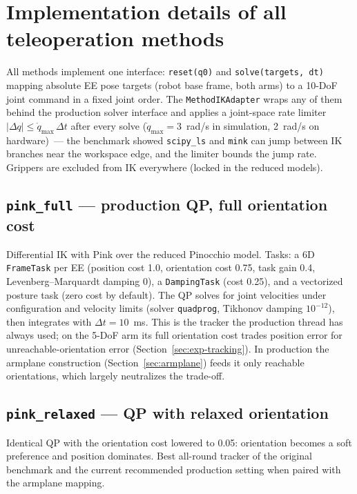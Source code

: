 \section{Implementation details of all teleoperation methods}
\label{app:methods}

All methods implement one interface: \texttt{reset(q0)} and
\texttt{solve(targets, dt)} mapping absolute EE pose targets (robot base
frame, both arms) to a 10-DoF joint command in a fixed joint order. The
\texttt{MethodIKAdapter} wraps any of them behind the production solver
interface and applies a joint-space rate limiter
\(\lvert\Delta q\rvert \le \dot q_{\max}\,\Delta t\) after every solve
(\(\dot q_{\max}=3\)~rad/s in simulation, 2~rad/s on hardware)~--- the
benchmark showed \texttt{scipy\_ls} and \texttt{mink} can jump between IK
branches near the workspace edge, and the limiter bounds the jump rate.
Grippers are excluded from IK everywhere (locked in the reduced models).

\subsection{\texttt{pink\_full} — production QP, full orientation cost}
\label{app:pink-full}

Differential IK with Pink over the reduced Pinocchio model. Tasks: a
6D \texttt{FrameTask} per EE (position cost 1.0, orientation cost 0.75,
task gain 0.4, Levenberg–Marquardt damping 0), a \texttt{DampingTask}
(cost 0.25), and a vectorized posture task (zero cost by default). The QP
solves for joint velocities under configuration and velocity limits
(solver \texttt{quadprog}, Tikhonov damping \(10^{-12}\)), then integrates
with \(\Delta t = 10\)~ms. This is the tracker the production thread has
always used; on the 5-DoF arm its full orientation cost trades position
error for unreachable-orientation error (Section~\ref{sec:exp-tracking}).
In production the armplane construction (Section~\ref{sec:armplane})
feeds it only reachable orientations, which largely neutralizes the
trade-off.

\subsection{\texttt{pink\_relaxed} — QP with relaxed orientation}
\label{app:pink-relaxed}

Identical QP with the orientation cost lowered to 0.05: orientation becomes
a soft preference and position dominates. Best all-round tracker of the
original benchmark and the current recommended production setting when
paired with the armplane mapping.

